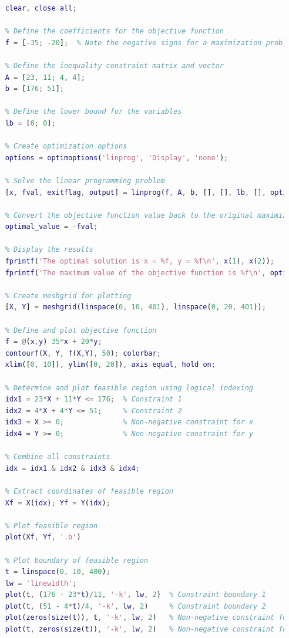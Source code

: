 \documentclass[12pt]{article}
\begin{document}
\begin{lstlisting}[language=Matlab, basicstyle=\scriptsize]
    %%Problem 2
    clear, close all;
    
    % Define the coefficients for the objective function
    f = [-35; -20];  % Note the negative signs for a maximization problem
    
    % Define the inequality constraint matrix and vector
    A = [23, 11; 4, 4];
    b = [176; 51];
    
    % Define the lower bound for the variables
    lb = [0; 0];
    
    % Create optimization options
    options = optimoptions('linprog', 'Display', 'none');
    
    % Solve the linear programming problem
    [x, fval, exitflag, output] = linprog(f, A, b, [], [], lb, [], options);
    
    % Convert the objective function value back to the original maximization problem
    optimal_value = -fval;
    
    % Display the results
    fprintf('The optimal solution is x = %f, y = %f\n', x(1), x(2));
    fprintf('The maximum value of the objective function is %f\n', optimal_value);
    
    % Create meshgrid for plotting
    [X, Y] = meshgrid(linspace(0, 10, 401), linspace(0, 20, 401));
    
    % Define and plot objective function
    f = @(x,y) 35*x + 20*y;
    contourf(X, Y, f(X,Y), 50); colorbar;
    xlim([0, 10]), ylim([0, 20]), axis equal, hold on;
    
    % Determine and plot feasible region using logical indexing
    idx1 = 23*X + 11*Y <= 176;  % Constraint 1
    idx2 = 4*X + 4*Y <= 51;     % Constraint 2
    idx3 = X >= 0;              % Non-negative constraint for x
    idx4 = Y >= 0;              % Non-negative constraint for y
    
    % Combine all constraints
    idx = idx1 & idx2 & idx3 & idx4;
    
    % Extract coordinates of feasible region
    Xf = X(idx); Yf = Y(idx);
    
    % Plot feasible region
    plot(Xf, Yf, '.b')
    
    % Plot boundary of feasible region
    t = linspace(0, 10, 400);
    lw = 'linewidth';
    plot(t, (176 - 23*t)/11, '-k', lw, 2)  % Constraint boundary 1
    plot(t, (51 - 4*t)/4, '-k', lw, 2)     % Constraint boundary 2
    plot(zeros(size(t)), t, '-k', lw, 2)   % Non-negative constraint for x
    plot(t, zeros(size(t)), '-k', lw, 2)   % Non-negative constraint for y
    

\end{lstlisting}
\end{document}
